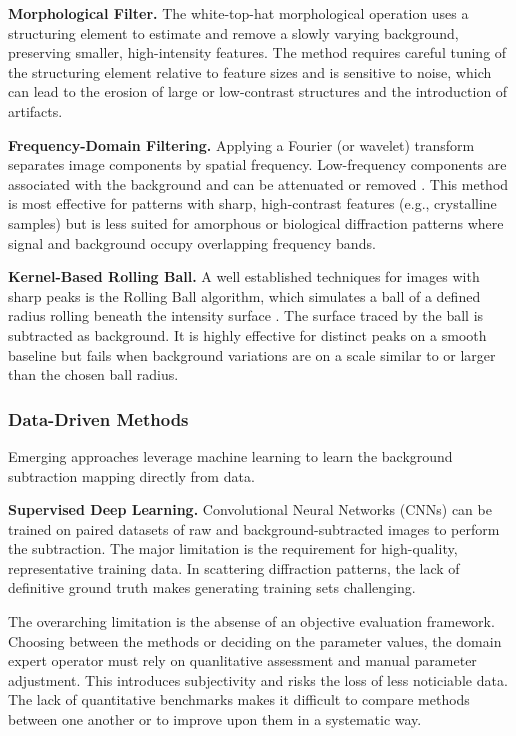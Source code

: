 \documentclass[iucr,review]{iucrjournals}
\begin{document}
        \textbf{Morphological Filter.}
        The white-top-hat morphological operation uses a structuring element
        to estimate and remove a slowly
        varying background, preserving smaller, high-intensity features. \cite{GonzalezWoodsDIP4e}
        The method requires careful tuning of the structuring element
        relative to feature sizes and is sensitive to noise,
        which can lead to the erosion of large
        or low-contrast structures and the introduction of artifacts.

        \textbf{Frequency-Domain Filtering.}
        Applying a Fourier (or wavelet) transform separates image components by spatial frequency.
        Low-frequency components are associated with the background and can be attenuated or removed
        \cite{PolarBackground2024, WaveletBiomedOptExpress2021}.
        This method is most effective for patterns with sharp, high-contrast features (e.g., crystalline samples)
        but is less suited for amorphous or biological diffraction patterns where signal and background occupy
        overlapping frequency bands.

        \textbf{Kernel-Based Rolling Ball.} A well established techniques for images with sharp peaks is
        the Rolling Ball algorithm, which simulates a ball of a defined radius rolling beneath the intensity surface \cite{Sternberg1983}.
        The surface traced by the ball is subtracted as background.
        It is highly effective for distinct peaks on a smooth baseline but fails when background variations
        are on a scale similar to or larger than the chosen ball radius.

    \subsubsection{Data-Driven Methods}
    Emerging approaches leverage machine learning to learn the background subtraction mapping directly from data.

        \textbf{Supervised Deep Learning.} Convolutional Neural Networks (CNNs) can be trained on paired datasets
        of raw and background-subtracted images to perform the subtraction.
        The major limitation is the requirement for high-quality, representative training data. In scattering diffraction patterns,
        the lack of definitive ground truth makes generating training sets challenging.
        
The overarching limitation is the absense of an objective evaluation framework. Choosing between the methods 
or deciding on the parameter values, the domain expert operator must rely on quanlitative assessment and manual parameter adjustment. 
This introduces subjectivity and risks the loss of less noticiable data. The lack of quantitative benchmarks makes it difficult
to compare methods between one another or to improve upon them in a systematic way.
\end{document}
